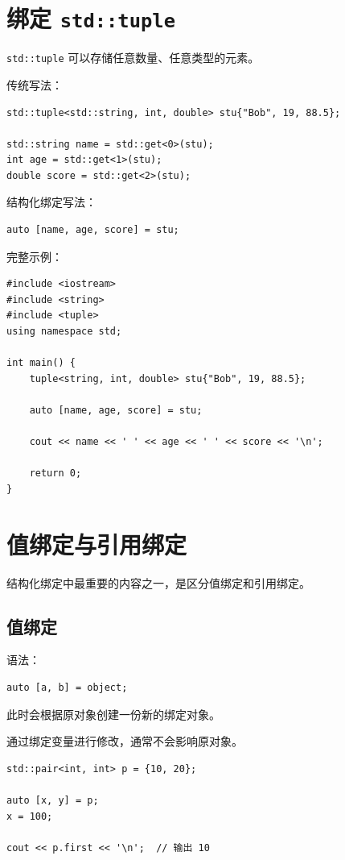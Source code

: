 \documentclass[UTF8,12pt,a4paper]{ctexart}
\begin{document}
\section{绑定 \texttt{std::tuple}}

\texttt{std::tuple} 可以存储任意数量、任意类型的元素。

传统写法：

\begin{lstlisting}
std::tuple<std::string, int, double> stu{"Bob", 19, 88.5};

std::string name = std::get<0>(stu);
int age = std::get<1>(stu);
double score = std::get<2>(stu);
\end{lstlisting}

结构化绑定写法：

\begin{lstlisting}
auto [name, age, score] = stu;
\end{lstlisting}

完整示例：

\begin{lstlisting}
#include <iostream>
#include <string>
#include <tuple>
using namespace std;

int main() {
    tuple<string, int, double> stu{"Bob", 19, 88.5};

    auto [name, age, score] = stu;

    cout << name << ' ' << age << ' ' << score << '\n';

    return 0;
}
\end{lstlisting}

\section{值绑定与引用绑定}

结构化绑定中最重要的内容之一，是区分值绑定和引用绑定。

\subsection{值绑定}

语法：

\begin{lstlisting}
auto [a, b] = object;
\end{lstlisting}

此时会根据原对象创建一份新的绑定对象。

通过绑定变量进行修改，通常不会影响原对象。

\begin{lstlisting}
std::pair<int, int> p = {10, 20};

auto [x, y] = p;
x = 100;

cout << p.first << '\n';  // 输出 10
\end{lstlisting}
\end{document}
